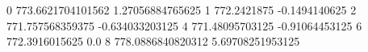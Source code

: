 0 773.6621704101562 1.27056884765625
1 772.2421875 -0.1494140625
2 771.757568359375 -0.634033203125
4 771.48095703125 -0.91064453125
6 772.3916015625 0.0
8 778.0886840820312 5.69708251953125
